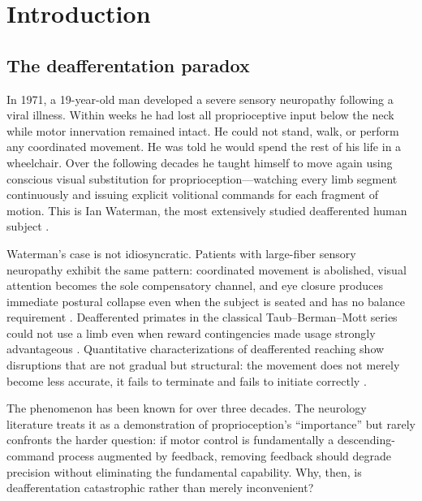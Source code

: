 \documentclass[11pt,twocolumn,a4paper]{article}
\theoremstyle{definition}
\theoremstyle{remark}
\begin{document}
\section{Introduction}
\label{sec:introduction}

\subsection{The deafferentation paradox}

In 1971, a 19-year-old man developed a severe sensory neuropathy
following a viral illness. Within weeks he had lost all proprioceptive
input below the neck while motor innervation remained intact. He could
not stand, walk, or perform any coordinated movement. He was told he
would spend the rest of his life in a wheelchair. Over the following
decades he taught himself to move again using conscious visual
substitution for proprioception---watching every limb segment
continuously and issuing explicit volitional commands for each
fragment of motion. This is Ian Waterman, the most extensively studied
deafferented human subject \citep{cole1991,cole2016}.

Waterman's case is not idiosyncratic. Patients with large-fiber
sensory neuropathy exhibit the same pattern: coordinated movement is
abolished, visual attention becomes the sole compensatory channel, and
eye closure produces immediate postural collapse even when the subject
is seated and has no balance requirement
\citep{sainburg1993,sainburg1995,ghez1995}. Deafferented primates in
the classical Taub--Berman--Mott series could not use a limb even when
reward contingencies made usage strongly advantageous
\citep{taub1965,taub1966}. Quantitative characterizations of
deafferented reaching show disruptions that are not gradual but
structural: the movement does not merely become less accurate, it
fails to terminate and fails to initiate correctly
\citep{gordon1995,sainburg1999}.

The phenomenon has been known for over three decades. The neurology
literature treats it as a demonstration of proprioception's
``importance'' but rarely confronts the harder question: if motor
control is fundamentally a descending-command process augmented by
feedback, removing feedback should degrade precision without
eliminating the fundamental capability. Why, then, is deafferentation
catastrophic rather than merely inconvenient?
\end{document}
